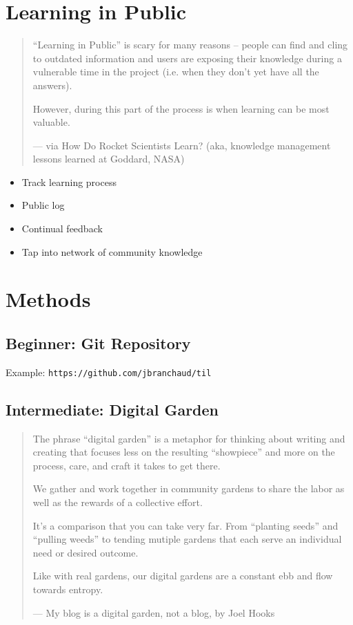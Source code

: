 \documentclass[11pt]{article}
\begin{document}
\section*{Learning in Public}
\label{sec:orgc77f799}
\begin{quote}
“Learning in Public” is scary for many reasons – people can find and cling to outdated information and users are exposing their knowledge during a vulnerable time in the project (i.e. when they don’t yet have all the answers).

However, during this part of the process is when learning can be most valuable.

— via How Do Rocket Scientists Learn? (aka, knowledge management lessons learned at Goddard, NASA)
\end{quote}

\begin{itemize}
\item Track learning process
\item Public log
\item Continual feedback
\item Tap into network of community knowledge
\end{itemize}

\section*{Methods}
\label{sec:org9ce2302}
\subsection*{Beginner: Git Repository}
\label{sec:org5988de3}
Example: \texttt{https://github.com/jbranchaud/til}

\subsection*{Intermediate: Digital Garden}
\label{sec:orgc6b93fc}
\begin{quote}
The phrase ``digital garden'' is a metaphor for thinking about writing and creating that focuses less on the resulting ``showpiece'' and more on the process, care, and craft it takes to get there.

We gather and work together in community gardens to share the labor as well as the rewards of a collective effort.

It's a comparison that you can take very far. From ``planting seeds'' and ``pulling weeds'' to tending mutiple gardens that each serve an individual need or desired outcome.

Like with real gardens, our digital gardens are a constant ebb and flow towards entropy.

— My blog is a digital garden, not a blog, by Joel Hooks
\end{quote}
\end{document}
